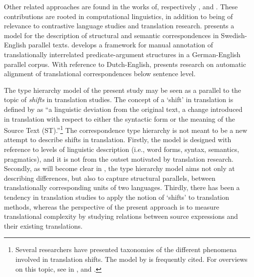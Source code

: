 \documentclass[output=paper]{LSP/langsci}
\begin{document}
Other related approaches are found in the works of, respectively \citet{Merkel1999,Cyrus2006}, and \citet{Macken2010}. These contributions are rooted in computational linguistics, in addition to being of relevance to contrastive language studies and translation research. \citet{Merkel1999} presents a model for the description of structural and semantic correspondences in Swedish-English parallel texts. \citet{Cyrus2006} develops a framework for manual annotation of translationally interrelated predicate-argument structures in a German-English parallel corpus. With reference to Dutch-English, \citet{Macken2010} presents research on automatic alignment of translational correspondences below sentence level.

The type hierarchy model of the present study may be seen as a parallel to the topic of \textit{shifts} in translation studies. The concept of a `shift' in translation is defined by \citet[104]{Palumbo2009} as ``a linguistic deviation from the original text, a change introduced in translation with respect to either the syntactic form or the meaning of the Source Text (ST).''\footnote{Several researchers have presented taxonomies of the different phenomena involved in translation shifts. The model by \citet{Leuven-Zwart1989,Leuven-Zwart1990} is frequently cited. For overviews on this topic, see  in \citet{Chesterman1997,Chesterman2005}, and \citet[104-106]{Palumbo2009}.} The correspondence type hierarchy is not meant to be a new attempt to describe shifts in translation. Firstly, the model is designed with reference to levels of linguistic description (i.e., word forms, syntax, semantics, pragmatics), and it is not from the outset motivated by translation research. Secondly, as will become clear in , the type hierarchy model aims not only at describing differences, but also to capture structural parallels, between translationally corresponding units of two languages. Thirdly, there has been a tendency in translation studies to apply the notion of `shifts' to translation methods, whereas the perspective of the present approach is to measure translational complexity by studying relations between source expressions and their existing translations.
\end{document}
